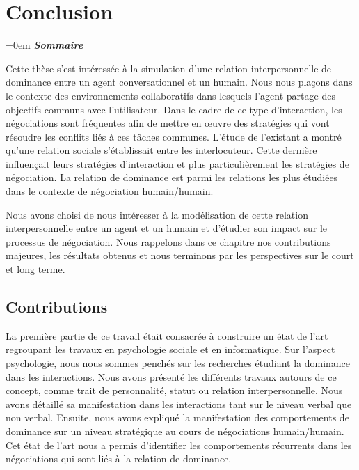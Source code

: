 \chapter{Conclusion}

\begingroup
\parindent=0em
\emph{\textbf{Sommaire}}
\localtableofcontents 
\clearpage
\endgroup

Cette thèse s'est intéressée à la simulation d'une relation interpersonnelle de dominance entre un agent conversationnel et un humain.
Nous nous plaçons dans le contexte des environnements collaboratifs dans lesquels l'agent partage des objectifs communs avec l'utilisateur. Dans le cadre de ce type d'interaction, les négociations sont fréquentes afin de mettre en œuvre des stratégies qui vont résoudre les conflits liés à ces tâches communes. 
L'étude de l'existant a montré qu'une relation sociale s'établissait entre les interlocuteur. Cette dernière influençait leurs stratégies d'interaction et plus particulièrement les stratégies de négociation. La relation de dominance est parmi les relations les plus étudiées dans le contexte de négociation humain/humain. 

Nous avons choisi de nous intéresser à la modélisation de cette relation interpersonnelle entre un agent et un humain et d'étudier son impact sur le processus de négociation.  Nous rappelons dans ce chapitre nos contributions majeures, les résultats obtenus et nous terminons par les perspectives sur le court et long terme. 

 
\section{Contributions}
	La première partie de ce travail était consacrée à construire un état de l'art regroupant les travaux en psychologie sociale et en informatique.  Sur l'aspect psychologie, nous nous sommes penchés sur les recherches étudiant la dominance dans les interactions. Nous avons présenté les différents travaux autours de ce concept, comme trait de personnalité, statut ou relation interpersonnelle.
	Nous avons détaillé sa manifestation dans les interactions tant sur le niveau verbal que non verbal. Ensuite, nous avons expliqué la manifestation des comportements de dominance sur un niveau stratégique au cours de négociations humain/humain.
	Cet état de l'art nous a permis d'identifier les comportements récurrents dans les négociations qui sont liés à la relation de dominance.
	
